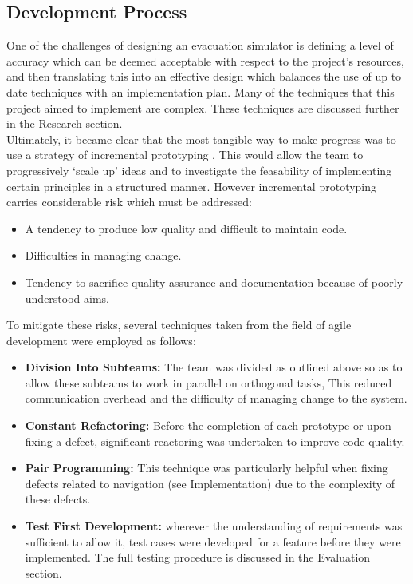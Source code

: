 \subsection{Development Process}
One of the challenges of designing an evacuation simulator is defining a level of accuracy which can be deemed acceptable with respect to the project's resources, and then translating this into an effective design which balances the use of up to date techniques with an implementation plan. Many of the techniques that this project aimed to implement are complex. These techniques are discussed further in the Research section.\\
Ultimately, it became clear that the most tangible way to make progress was to use a strategy of incremental prototyping \cite[Ch 2.3.2]{SommervilleSoftwareEng}. This would allow the team to progressively `scale up' ideas and to investigate the feasability of implementing certain principles in a structured manner. However incremental prototyping carries considerable risk which must be addressed:
\begin{itemize}
\item A tendency to produce low quality and difficult to maintain code.
\item Difficulties in managing change.
\item Tendency to sacrifice quality assurance and documentation because of poorly understood aims.
\end{itemize}

To mitigate these risks, several techniques taken from the field of agile development \cite[Ch. 3]{SommervilleSoftwareEng} were employed as follows:
\begin{itemize}
\item \textbf{Division Into Subteams:} The team was divided as outlined above so as to allow these subteams to work in parallel on orthogonal tasks, This reduced communication overhead and the difficulty of managing change to the system.
\item \textbf{Constant Refactoring:} Before the completion of each prototype or upon fixing a defect, significant reactoring was undertaken to improve code quality.
\item \textbf{Pair Programming:} This technique was particularly helpful when fixing defects related to navigation (see Implementation) due to the complexity of these defects.
\item \textbf{Test First Development:} wherever the understanding of requirements was sufficient to allow it, test cases were developed for a feature before they were implemented. The full testing procedure is discussed in the Evaluation section.
\end{itemize}

%
